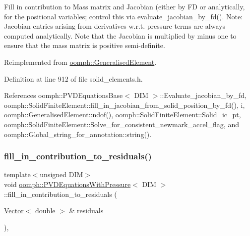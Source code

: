 Fill in contribution to Mass matrix and Jacobian (either by FD or analytically, for the positional variables; control this via evaluate\+\_\+jacobian\+\_\+by\+\_\+fd(). Note\+: Jacobian entries arising from derivatives w.\+r.\+t. pressure terms are always computed analytically. Note that the Jacobian is multiplied by minus one to ensure that the mass matrix is positive semi-\/definite. 



Reimplemented from \hyperlink{classoomph_1_1GeneralisedElement_a2b6294a730647cf865da94f2531466f8}{oomph\+::\+Generalised\+Element}.



Definition at line 912 of file solid\+\_\+elements.\+h.



References oomph\+::\+P\+V\+D\+Equations\+Base$<$ D\+I\+M $>$\+::\+Evaluate\+\_\+jacobian\+\_\+by\+\_\+fd, oomph\+::\+Solid\+Finite\+Element\+::fill\+\_\+in\+\_\+jacobian\+\_\+from\+\_\+solid\+\_\+position\+\_\+by\+\_\+fd(), i, oomph\+::\+Generalised\+Element\+::ndof(), oomph\+::\+Solid\+Finite\+Element\+::\+Solid\+\_\+ic\+\_\+pt, oomph\+::\+Solid\+Finite\+Element\+::\+Solve\+\_\+for\+\_\+consistent\+\_\+newmark\+\_\+accel\+\_\+flag, and oomph\+::\+Global\+\_\+string\+\_\+for\+\_\+annotation\+::string().

\mbox{\label{classoomph_1_1PVDEquationsWithPressure_a6e44d72eea0bbb65d43d01789fcf452c}} 
\subsubsection{\texorpdfstring{fill\+\_\+in\+\_\+contribution\+\_\+to\+\_\+residuals()}{fill\_in\_contribution\_to\_residuals()}}
{\footnotesize\ttfamily template$<$unsigned D\+IM$>$ \\
void \hyperlink{classoomph_1_1PVDEquationsWithPressure}{oomph\+::\+P\+V\+D\+Equations\+With\+Pressure}$<$ D\+IM $>$\+::fill\+\_\+in\+\_\+contribution\+\_\+to\+\_\+residuals (\begin{DoxyParamCaption}\item[{\hyperlink{classoomph_1_1Vector}{Vector}$<$ double $>$ \&}]{residuals }\end{DoxyParamCaption})\hspace{0.3cm}{\ttfamily [inline]}, {\ttfamily [virtual]}}



